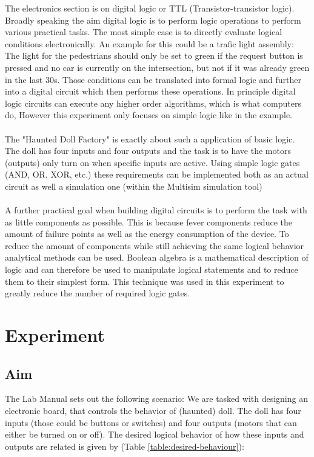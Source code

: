 \documentclass[14pt]{article}
\begin{document}
The electronics section is on digital logic or TTL (Transistor-transistor logic). Broadly speaking the aim digital logic is to perform logic
operations to perform various practical tasks. The most simple case is to directly evaluate logical conditions electronically. An example for this could
be a trafic light assembly: The light for the pedestrians should only be set to green if the request button is pressed and no car is currently
on the intersection, but not if it was already green in the last 30s. Those conditions can be translated into formal logic and further into
a digital circuit which then performs these operations. In principle digital logic circuits can execute any higher order algorithms, which is what computers do,
However this experiment only focuses on simple logic like in the example.\\
\\
The "Haunted Doll Factory" is exactly about such a application of basic logic. The doll has four inputs and four outputs and the task is to 
have the motors (outputs) only turn on when specific inputs are active. Using simple logic gates (AND, OR, XOR, etc.) these requirements can be implemented
both as an actual circuit as well a simulation one (within the Multisim simulation tool)\\
\\
A further practical goal when building digital circuits is to perform the task with as little components as possible. This is because fever components
reduce the amount of failure points as well as the energy consumption of the device. To reduce the amount of components while still achieving the
same logical behavior analytical methods can be used. Boolean algebra is a mathematical description of logic and can therefore be used
to manipulate logical statements and to reduce them to their simplest form. This technique was used in this experiment to greatly reduce the 
number of required logic gates.

\section{Experiment}

\subsection{Aim}
The Lab Manual sets out the following scenario: We are tasked with designing an electronic board, that controls the behavior of (haunted) doll.
The doll has four inputs (those could be buttons or switches) and four outputs (motors that can either be turned on or off). The desired logical
behavior of how these inputs and outputs are related is given by (Table \ref{table:desired-behaviour}):
\end{document}
